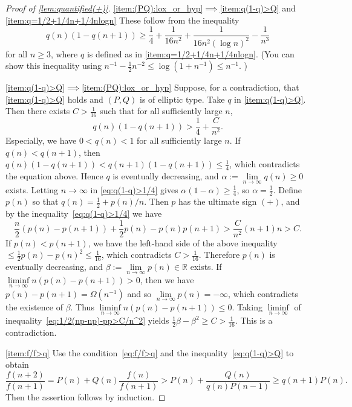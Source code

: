 \documentclass[a4paper,UKenglish,cleveref,autoref,thm-restate]{lipics-v2021}
\newcommand{\R}{\mathbb{R}}
\begin{document}
\begin{proof}[Proof of \cref{lem:quantified(+)}]
\eqref{item:(PQ):lox_or_hyp}$\implies$\eqref{item:q(1-q)>Q} and \eqref{item:q=1/2+1/4n+1/4nlogn} These follow from the inequality
\[
q(n)(1-q(n+1)) \geq \frac14 + \frac{1}{16n^2} + \frac{1}{16n^2(\log n)^2} - \frac1{n^3}
\]
for all $n \geq 3$, where $q$ is defined as in \eqref{item:q=1/2+1/4n+1/4nlogn}. (You can show this inequality using $n^{-1} - \frac12 n^{-2} \leq \log(1+n^{-1}) \leq n^{-1}$. )

\eqref{item:q(1-q)>Q}$\implies$\eqref{item:(PQ):lox_or_hyp} Suppose, for a contradiction, that \eqref{item:q(1-q)>Q} holds and $(P, Q)$ is of elliptic type. Take $q$ in \eqref{item:q(1-q)>Q}. Then there exists $C > \frac1{16}$ such that for all sufficiently large $n$, 
\begin{equation} \label{eq:q(1-q)>1/4}
q(n) (1-q(n+1)) > \frac14 + \frac{C}{n^{2}}. 
\end{equation}
Especially, we have $0 < q(n) < 1$ for all sufficiently large $n$. If $q(n) < q(n+1)$, then $q(n)(1-q(n+1)) < q(n+1)(1-q(n+1)) \leq \frac14$, which contradicts the equation above. Hence $q$ is eventually decreasing, and $\alpha := \lim\limits_{n \to \infty} q(n) \geq 0$ exists. Letting $n \to \infty$ in \cref{eq:q(1-q)>1/4} gives $\alpha(1-\alpha) \geq \frac14$, so $\alpha = \frac12$. Define $p(n)$ so that $q(n) = \frac12 + p(n) / n$. Then $p$ has the ultimate sign $(+)$, and by the inequality~\eqref{eq:q(1-q)>1/4} we have
\begin{equation} \label{eq:1/2(np-np)-pp>C/n^2}
\frac{n}2 (p(n) - p(n+1)) + \frac12 p(n) - p(n)p(n+1) > \frac{C}{n^{2}} (n+1) n > C. 
\end{equation}
If $p(n) < p(n+1)$, we have the left-hand side of the above inequality $\leq \frac12 p(n) - p(n)^2 \leq \frac1{16}$, which contradicts $C > \frac1{16}$. Therefore $p(n)$ is eventually decreasing, and $\beta := \lim\limits_{n \to \infty} p(n) \in \R$ exists. If $\liminf\limits_{n \to \infty} n (p(n) - p(n+1)) > 0$, then we have $p(n) - p(n+1) = \Omega(n^{-1})$ and so $\lim\limits_{n \to \infty} p(n) = -\infty$, which contradicts the existence of $\beta$. Thus $\liminf\limits_{n \to \infty} n (p(n) - p(n+1)) \leq 0$. Taking $\liminf\limits_{n \to \infty}$ of inequality~\eqref{eq:1/2(np-np)-pp>C/n^2} yields $\frac12 \beta - \beta^2 \geq C > \frac1{16}$. This is a contradiction. 


\eqref{item:f/f>q} Use the condition~\eqref{eq:f/f>q} and the inequality~\eqref{eq:q(1-q)>Q} to obtain
\[
\frac{f(n+2)}{f(n+1)} 
=
P(n) + Q(n) \frac{f(n)}{f(n+1)}
>
P(n) + \frac{Q(n)}{q(n)P(n-1)}
\geq 
q(n+1)P(n).
\]
Then the assertion follows by induction. 
\end{proof}
\end{document}

